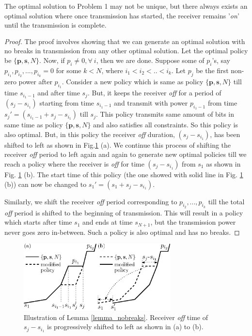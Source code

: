 \begin{lemma}
The optimal solution to Problem 1 may not be unique, but there always exists an optimal solution where once transmission has started, the receiver remains '\textit{on}' until the transmission is complete. \label{lemma_nobreaks}
\end{lemma}
\begin{proof}
The proof involves showing that we can generate an optimal solution with no breaks in transmission from any other optimal solution. Let the optimal policy be $\{\textbf{p},\textbf{s},N\}$. Now, if $p_i\neq 0,\forall \ i$, then we are done. Suppose some of $p_i$'s, say $p_{i_1},p_{i_2},...,p_{i_k}=0$ for some $k<N$, where $i_1<i_2<..<i_k$. Let $p_j$ be the first non-zero power after $p_{i_1}$. Consider a new policy which is same as policy $\{\textbf{p},\textbf{s},N\}$ till time $s_{i_1-1}$ and after time $s_{j}$. But, it keeps the receiver \textit{off} for a period of $(s_{j}-s_{i_1})$ starting from time $s_{i_1-1}$ and transmit with power $p_{i_1-1}$ from time $s_j'=(s_{i_1-1}+s_{j}-s_{i_1})$ till $s_j$. This policy transmits same amount of bits in same time as policy $\{\textbf{p},\textbf{s},N\}$ and also satisfies all constraints. So this policy is also optimal. But, in this policy the receiver \textit{off} duration, $(s_{j}-s_{i_1})$, has been shifted to left as shown in Fig.\ref{fig_Lemma2} (a). We continue this process of shifting the receiver \textit{off} period to left again and again to generate new optimal  policies till we reach a policy where the receiver is \textit{off} for time $(s_{j}-s_{i_1})$ from $s_1$ as shown in Fig. \ref{fig_Lemma2} (b). The start time of this policy (the one showed with solid line in Fig. \ref{fig_Lemma2} (b)) can now be changed to $s_1'=(s_1+s_{j}-s_{i_1})$. 

Similarly, we shift the receiver \textit{off} period corresponding to $p_{i_2},...,p_{i_k}$ till the total \textit{off} period is shifted to the beginning of transmission. This will result in a policy which starts after time $s_1$ and ends at time $s_{N+1}$, but the transmission power never goes zero in-between. Such a policy is also optimal and has no breaks.
\end{proof}
\begin{figure}[htb]
  \centering
  \centerline{\includegraphics[width=8cm]{Lemma2.eps}}
\caption{Illustration of Lemma \ref{lemma_nobreaks}. Receiver \textit{off} time of $s_{j}-s_{i_1}$ is progressively shifted to left as shown in (a) to (b).}\label{fig_Lemma2}
\end{figure}
